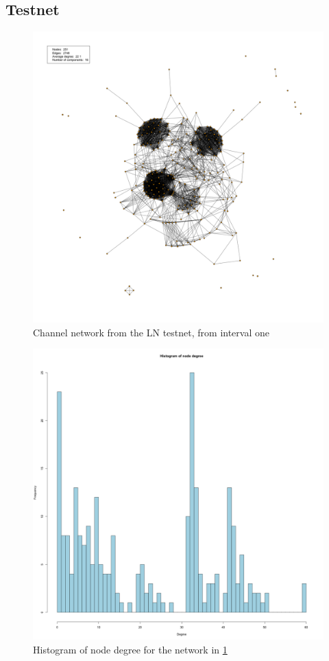 \subsection{Testnet}

\begin{figure}[ht]
    \centering
    \includegraphics[width=14cm]{figures/graphs/cg_ln_testnet_run1.png}
    \caption{Channel network from the LN testnet, from interval one}
    \label{fig:channel_network_LN_testnet}
\end{figure}

\begin{figure}[H]
    \centering
    \includegraphics[width=16cm]{figures/graphs/histogram_ln_testnet_run1.png}
    \caption{Histogram of node degree for the network in \cref{fig:channel_network_LN_testnet}}
    \label{fig:histogram}
\end{figure}


